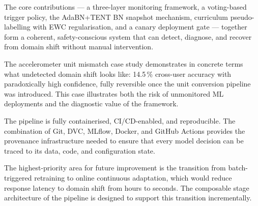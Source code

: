 The core contributions --- a three-layer monitoring framework, a voting-based
trigger policy, the AdaBN+TENT BN snapshot mechanism, curriculum pseudo-labelling
with EWC regularisation, and a canary deployment gate --- together form a
coherent, safety-conscious system that can detect, diagnose, and recover from
domain shift without manual intervention.

The accelerometer unit mismatch case study demonstrates in concrete terms what
undetected domain shift looks like: 14.5\,\% cross-user accuracy with
paradoxically high confidence, fully reversible once the unit conversion
pipeline was introduced.
This case illustrates both the risk of unmonitored ML deployments and the
diagnostic value of the framework.

The pipeline is fully containerised, CI/CD-enabled, and reproducible.
The combination of Git, DVC, MLflow, Docker, and GitHub Actions provides the
provenance infrastructure needed to ensure that every model decision can be
traced to its data, code, and configuration state.

The highest-priority area for future improvement is the transition from
batch-triggered retraining to online continuous adaptation, which would reduce
response latency to domain shift from hours to seconds.
The composable stage architecture of the pipeline is designed to support this
transition incrementally.

